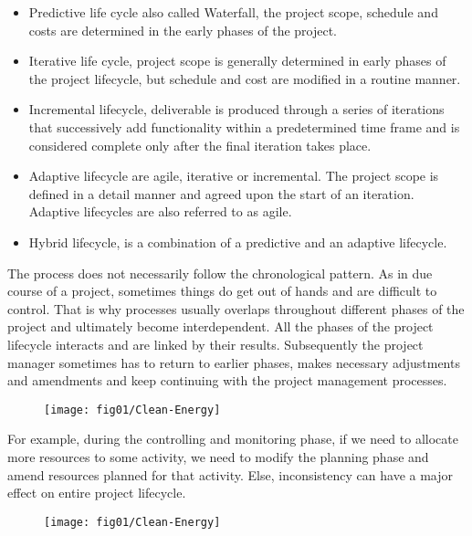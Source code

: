 \begin{itemize}
    \item Predictive life cycle also called Waterfall, the project scope, schedule and costs are determined in the early phases of the project.

    \item Iterative life cycle, project scope is generally determined in early phases of the project lifecycle, but schedule and cost are modified in a routine manner.

    \item Incremental lifecycle, deliverable is produced through a series of iterations that successively add functionality within a predetermined time frame and is considered complete only after the final iteration takes place.

    \item Adaptive lifecycle are agile, iterative or incremental. The project scope is defined in a detail manner and agreed upon the start of an iteration. Adaptive lifecycles are also referred to as agile.
    \item Hybrid lifecycle, is a combination of a predictive and an adaptive lifecycle. 
  
\end{itemize}

The process does not necessarily follow the chronological pattern. As in due course of a project, sometimes things do get out of hands and are difficult to control. That is why processes usually overlaps throughout different phases of the project and ultimately become interdependent. All the phases of the project lifecycle interacts and are linked by their results. Subsequently the project manager sometimes has to return to earlier phases, makes necessary adjustments and amendments and keep continuing with the project management processes. 

 \begin{figure}
\centering
  \texttt{[image: fig01/Clean-Energy]}
 \end{figure}

For example, during the controlling and monitoring phase, if we need to allocate more resources to some activity, we need to modify the planning phase and amend resources planned for that activity. Else, inconsistency can have a major effect on entire project lifecycle.
\begin{figure}
\centering
  \texttt{[image: fig01/Clean-Energy]}
 \end{figure}
 

